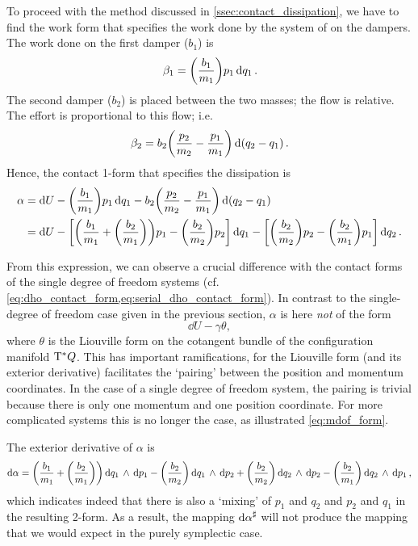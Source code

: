 To proceed with the method discussed in \cref{ssec:contact_dissipation}, we have to find the work form that specifies the work done by the system of on the dampers. The work done on the first damper (\(b_1\)) is
\begin{equation}
     \beta_1 = \qty(\frac{b_1}{m_1})p_1\dd{q_1}.
\end{equation}
The second damper (\(b_2\)) is placed between the two masses; the flow is relative. The effort is proportional to this flow; i.e.
\begin{equation}
     \beta_2 = b_2\qty(\frac{p_2}{m_2} - \frac{p_1}{m_1})\dd{\qty(q_2 - q_1)}.
\end{equation}
Hence, the contact 1-form that specifies the dissipation is
\begin{equation}
    \begin{split}
        \alpha  &= \dd{U} - \qty(\frac{b_1}{m_1})p_1\dd{q_1} - b_2\qty(\frac{p_2}{m_2} - \frac{p_1}{m_1})\dd{\qty(q_2 - q_1)} \\
                &= \dd{U} - \qty[\qty(\frac{b_1}{m_1} + \qty(\frac{b_2}{m_1})) p_1 - \qty(\frac{b_2}{m_2})p_2]\dd{q_1}
                          - \qty[\qty(\frac{b_2}{m_2})p_2 - \qty(\frac{b_2}{m_1})p_1]\dd{q_2}.
    \end{split}
    \label{eq:mdof_form}
\end{equation}

From this expression, we can observe a crucial difference with the contact forms of the single degree of freedom systems (cf. \cref{eq:dho_contact_form,eq:serial_dho_contact_form}). In contrast to the single-degree of freedom case given in the previous section, \(\alpha\) is here \emph{not} of the form
\begin{equation}
     \dd{U} - \gamma \theta,
\end{equation}
where \(\theta\) is the Liouville form on the cotangent bundle of the configuration manifold \(\mathrm{T}^*Q\). This has important ramifications, for the Liouville form (and its exterior derivative) facilitates the `pairing' between the position and momentum coordinates. In the case of a single degree of freedom system, the pairing is trivial because there is only one momentum and one position coordinate. For more complicated systems this is no longer the case, as illustrated \cref{eq:mdof_form}.

The exterior derivative of \(\alpha\) is
\begin{equation}
     \dd{\alpha} = \qty(\frac{b_1}{m_1} + \qty(\frac{b_2}{m_1}))  \dd{q_1}\,\wedge\,\dd{p_1} 
                  -\qty(\frac{b_2}{m_2}) \dd{q_1}\,\wedge\,\dd{p_2} 
                  + \qty(\frac{b_2}{m_2}) \dd{q_2}\,\wedge\,\dd{p_2} 
                  - \qty(\frac{b_2}{m_1}) \dd{q_2}\,\wedge\,\dd{p_1} ,
\end{equation}
which indicates indeed that there is also a `mixing' of \(p_1\) and \(q_2\) and \(p_2\) and \(q_1\) in the resulting 2-form. As a result, the mapping \( \dd{\alpha}^\sharp \) will not produce the mapping that we would expect in the purely symplectic case.

